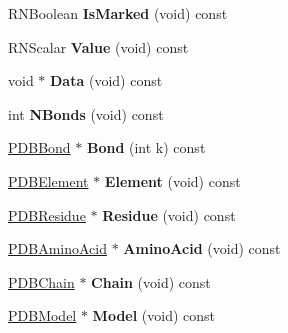 \begin{DoxyCompactItemize}
\item 
R\+N\+Boolean {\bfseries Is\+Marked} (void) const \hypertarget{class_p_d_b_atom_ab38884631f3d251fb05c7809258f107b}{}\label{class_p_d_b_atom_ab38884631f3d251fb05c7809258f107b}

\item 
R\+N\+Scalar {\bfseries Value} (void) const \hypertarget{class_p_d_b_atom_a45576589f400e853e06fecafe7758800}{}\label{class_p_d_b_atom_a45576589f400e853e06fecafe7758800}

\item 
void $\ast$ {\bfseries Data} (void) const \hypertarget{class_p_d_b_atom_a1f4fb7997d9c4184b289ab81f3d7bd85}{}\label{class_p_d_b_atom_a1f4fb7997d9c4184b289ab81f3d7bd85}

\item 
int {\bfseries N\+Bonds} (void) const \hypertarget{class_p_d_b_atom_a7e367b27d47a5c70549d4c74c7559e70}{}\label{class_p_d_b_atom_a7e367b27d47a5c70549d4c74c7559e70}

\item 
\hyperlink{class_p_d_b_bond}{P\+D\+B\+Bond} $\ast$ {\bfseries Bond} (int k) const \hypertarget{class_p_d_b_atom_a825cbb271720a2e6a24341546e6c2c8d}{}\label{class_p_d_b_atom_a825cbb271720a2e6a24341546e6c2c8d}

\item 
\hyperlink{class_p_d_b_element}{P\+D\+B\+Element} $\ast$ {\bfseries Element} (void) const \hypertarget{class_p_d_b_atom_a705d3fd2867e06ec092f3e6fe2d80743}{}\label{class_p_d_b_atom_a705d3fd2867e06ec092f3e6fe2d80743}

\item 
\hyperlink{class_p_d_b_residue}{P\+D\+B\+Residue} $\ast$ {\bfseries Residue} (void) const \hypertarget{class_p_d_b_atom_a559783da8d933a8fe9a74abedf843a41}{}\label{class_p_d_b_atom_a559783da8d933a8fe9a74abedf843a41}

\item 
\hyperlink{class_p_d_b_amino_acid}{P\+D\+B\+Amino\+Acid} $\ast$ {\bfseries Amino\+Acid} (void) const \hypertarget{class_p_d_b_atom_a4b9627d71957df88f275be5f1eb6c51e}{}\label{class_p_d_b_atom_a4b9627d71957df88f275be5f1eb6c51e}

\item 
\hyperlink{class_p_d_b_chain}{P\+D\+B\+Chain} $\ast$ {\bfseries Chain} (void) const \hypertarget{class_p_d_b_atom_a1ddd6fcf15f6e4046981b8ed5303d16e}{}\label{class_p_d_b_atom_a1ddd6fcf15f6e4046981b8ed5303d16e}

\item 
\hyperlink{class_p_d_b_model}{P\+D\+B\+Model} $\ast$ {\bfseries Model} (void) const \hypertarget{class_p_d_b_atom_a9739871bc4ce37b4af4d4bf78aff200c}{}\label{class_p_d_b_atom_a9739871bc4ce37b4af4d4bf78aff200c}


\end{DoxyCompactItemize}
